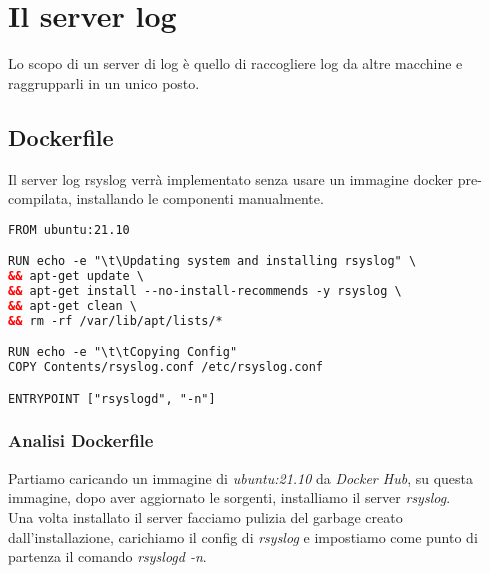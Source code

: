 \documentclass[../DocumentazioneProgetto.tex]{subfiles}
\begin{document}
	\section{Il server log} 
	\label{sec:Rsyslog}
	Lo scopo di un server di log è quello di raccogliere log da altre macchine e raggrupparli in un unico posto.
\subsection{Dockerfile} 
\label{sec:RsyslogDockerfile}
Il server log rsyslog verrà implementato senza usare un immagine docker pre-compilata, installando le componenti manualmente.
\begin{lstlisting}[language=XML, caption=Dockerfile Rsyslog] 
FROM ubuntu:21.10

RUN echo -e "\t\Updating system and installing rsyslog" \
&& apt-get update \
&& apt-get install --no-install-recommends -y rsyslog \
&& apt-get clean \
&& rm -rf /var/lib/apt/lists/*

RUN echo -e "\t\tCopying Config"
COPY Contents/rsyslog.conf /etc/rsyslog.conf

ENTRYPOINT ["rsyslogd", "-n"]\end{lstlisting}
\subsubsection{Analisi Dockerfile} 
Partiamo caricando un immagine di \textit{ubuntu:21.10} da \textit{Docker Hub}, su questa immagine,
dopo aver aggiornato le sorgenti, installiamo il server \textit{rsyslog}.\\
Una volta installato il server facciamo pulizia del garbage creato dall'installazione, carichiamo il config di \textit{rsyslog} e
impostiamo come punto di partenza il comando \textit{rsyslogd -n}.  


\end{document}
